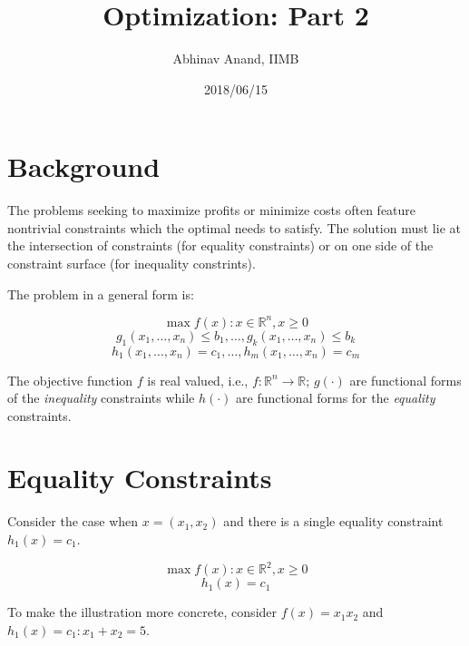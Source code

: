 \documentclass[11pt,]{article}
\title{Optimization: Part 2}
\author{Abhinav Anand, IIMB}
\date{2018/06/15}
\begin{document}
\maketitle

\section{Background}\label{background}

The problems seeking to maximize profits or minimize costs often feature
nontrivial constraints which the optimal needs to satisfy. The solution
must lie at the intersection of constraints (for equality constraints)
or on one side of the constraint surface (for inequality constrints).

The problem in a general form is:

\[
\max f(x): x\in \mathbb{R}^n, x\geq 0
\] \[
g_1(x_1,\hdots,x_n)\leq b_1,\hdots,g_k(x_1,\hdots,x_n)\leq b_k
\] \[
h_1(x_1,\hdots,x_n)= c_1,\hdots,h_m(x_1,\hdots,x_n)= c_m
\]

The objective function \(f\) is real valued, i.e.,
\(f:\mathbb{R}^n \to \mathbb{R}\); \(g(\cdot)\) are functional forms of
the \emph{inequality} constraints while \(h(\cdot)\) are functional
forms for the \emph{equality} constraints.

\section{Equality Constraints}\label{equality-constraints}

Consider the case when \(x=(x_1, x_2)\) and there is a single equality
constraint \(h_1(x) = c_1\).

\[
\max f(x): x\in \mathbb{R}^2, x\geq 0
\] \[
h_1(x) = c_1
\]

To make the illustration more concrete, consider \(f(x) = x_1x_2\) and
\(h_1(x)=c_1:x_1+ x_2=5\).
\end{document}
